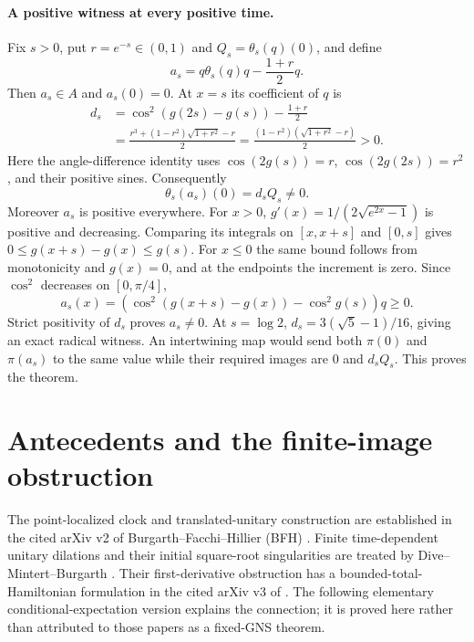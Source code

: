 \documentclass[11pt]{article}
\begin{document}
\paragraph{A positive witness at every positive time.}
Fix $s>0$, put $r=e^{-s}\in(0,1)$ and $Q_s=\theta_s(q)(0)$, and define
\[
 a_s=q\theta_s(q)q-\frac{1+r}{2}q.
\]
Then $a_s\in A$ and $a_s(0)=0$. At $x=s$ its coefficient of $q$ is
\begin{align*}
 d_s&=\cos^2(g(2s)-g(s))-\frac{1+r}{2}\\
 &=\frac{r^3+(1-r^2)\sqrt{1+r^2}-r}{2}
 =\frac{(1-r^2)(\sqrt{1+r^2}-r)}{2}>0.
\end{align*}
Here the angle-difference identity uses
$\cos(2g(s))=r$, $\cos(2g(2s))=r^2$, and their positive sines.
Consequently
\[
 \theta_s(a_s)(0)=d_s Q_s\ne0.
\]
Moreover $a_s$ is positive everywhere. For $x>0$,
$g'(x)=1/(2\sqrt{e^{2x}-1})$ is positive and decreasing. Comparing
its integrals on $[x,x+s]$ and $[0,s]$ gives
$0\leq g(x+s)-g(x)\leq g(s)$. For $x\leq0$ the same bound follows
from monotonicity and $g(x)=0$, and at the endpoints the increment is
zero. Since $\cos^2$ decreases on $[0,\pi/4]$,
\[
 a_s(x)=\left(\cos^2(g(x+s)-g(x))-\cos^2g(s)\right)q\geq0.
\]
Strict positivity of $d_s$ proves $a_s\ne0$. At $s=\log2$,
$d_s=3(\sqrt5-1)/16$, giving an exact radical witness.
An intertwining map would send both $\pi(0)$ and $\pi(a_s)$ to the
same value while their required images are $0$ and $d_s Q_s$.
This proves the theorem.

\section*{Antecedents and the finite-image obstruction}
The point-localized clock and translated-unitary construction are
established in the cited arXiv v2 of Burgarth--Facchi--Hillier (BFH)
\cite[Definition~4.1, Theorem~4.4, Step~2, equation~(11)]{bfh}.
Finite time-dependent unitary dilations and their initial square-root
singularities are treated by Dive--Mintert--Burgarth
\cite[Method, Appendices~A--B, arXiv~v3]{dmb}. Their first-derivative
obstruction has a bounded-total-Hamiltonian formulation in the cited
arXiv v3 of \cite[Theorem~1]{ende}.
The following elementary conditional-expectation version explains the
connection; it is proved here rather than attributed to those papers
as a fixed-GNS theorem.
\end{document}
